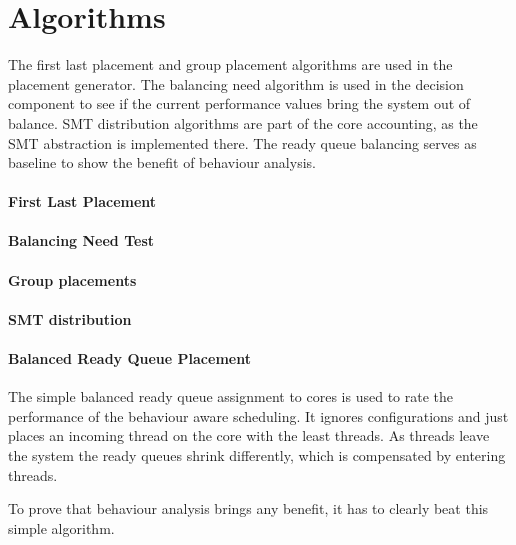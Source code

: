\section{Algorithms}
\label{impl:algos}

The first last placement and group placement algorithms are used in the
placement generator.
The balancing need algorithm is used in the decision component to see if the
current performance values bring the system out of balance.
SMT distribution algorithms are part of the core accounting, as the SMT
abstraction is implemented there.
The ready queue balancing serves as baseline to show the benefit of behaviour
analysis.

\paragraph{First Last Placement}
\paragraph{Balancing Need Test}
\paragraph{Group placements}
\paragraph{SMT distribution}
\paragraph{Balanced Ready Queue Placement}
The simple balanced ready queue assignment to cores is used to rate the
performance of the behaviour aware scheduling.
It ignores configurations and just places an incoming thread on the core with
the least threads.
As threads leave the system the ready queues shrink differently, which is
compensated by entering threads.

To prove that behaviour analysis brings any benefit, it has to clearly beat
this simple algorithm.
